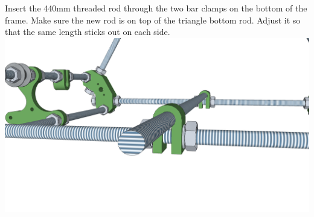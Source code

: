\documentclass[twoside,openany,a4paper,titlepage]{memoir}
\begin{document}
	\section{}
	Insert the 440mm threaded rod through the two bar clamps on the bottom of the frame. Make sure the
	new rod is on top of the triangle bottom rod. Adjust it so that the same length sticks out on each side.\\
	\includegraphics[width=1\linewidth]{graphics/ch5_5.png}
	
\end{document}

